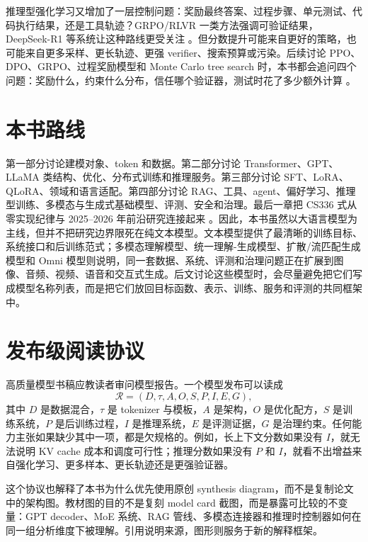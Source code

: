 \documentclass[UTF8,zihao=-4,openany]{ctexbook}
\newcommand{\Transformer}{Transformer}
\newcommand{\rag}{RAG}
\begin{document}
推理型强化学习又增加了一层控制问题：奖励最终答案、过程步骤、单元测试、代码执行结果，还是工具轨迹？GRPO/RLVR 一类方法强调可验证结果，DeepSeek-R1 等系统让这种路线更受关注 \cite{deepseek2025r1,wen2025rlvr}。但分数提升可能来自更好的策略，也可能来自更多采样、更长轨迹、更强 verifier、搜索预算或污染。后续讨论 PPO、DPO、GRPO、过程奖励模型和 Monte Carlo tree search 时，本书都会追问四个问题：奖励什么，约束什么分布，信任哪个验证器，测试时花了多少额外计算 \cite{chen2025reasoning,snell2024scaling,yang2025testtime}。

\section{本书路线}
第一部分讨论建模对象、token 和数据。第二部分讨论 \Transformer、GPT、LLaMA 类结构、优化、分布式训练和推理服务。第三部分讨论 SFT、LoRA、QLoRA、领域和语言适配。第四部分讨论 \rag、工具、agent、偏好学习、推理型训练、多模态与生成式基础模型、评测、安全和治理。最后一章把 CS336 式从零实现纪律与 2025--2026 年前沿研究连接起来 \cite{stanfordcs3362026}。因此，本书虽然以大语言模型为主线，但并不把研究边界限死在纯文本模型。文本模型提供了最清晰的训练目标、系统接口和后训练范式；多模态理解模型、统一理解-生成模型、扩散/流匹配生成模型和 Omni 模型则说明，同一套数据、系统、评测和治理问题正在扩展到图像、音频、视频、语音和交互式生成。后文讨论这些模型时，会尽量避免把它们写成模型名称列表，而是把它们放回目标函数、表示、训练、服务和评测的共同框架中。

\section{发布级阅读协议}
高质量模型书稿应教读者审问模型报告。一个模型发布可以读成
\[
\mathcal{R}=(D,\tau,A,O,S,P,I,E,G),
\]
其中 $D$ 是数据混合，$\tau$ 是 tokenizer 与模板，$A$ 是架构，$O$ 是优化配方，$S$ 是训练系统，$P$ 是后训练过程，$I$ 是推理系统，$E$ 是评测证据，$G$ 是治理约束。任何能力主张如果缺少其中一项，都是欠规格的。例如，长上下文分数如果没有 $I$，就无法说明 KV cache 成本和调度可行性；推理分数如果没有 $P$ 和 $I$，就看不出增益来自强化学习、更多样本、更长轨迹还是更强验证器。

这个协议也解释了本书为什么优先使用原创 synthesis diagram，而不是复制论文中的架构图。教材图的目的不是复刻 model card 截图，而是暴露可比较的不变量：GPT decoder、MoE 系统、RAG 管线、多模态连接器和推理时控制器如何在同一组分析维度下被理解。引用说明来源，图形则服务于新的解释框架。
\end{document}
